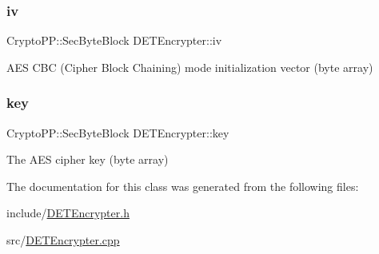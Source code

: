 \subsubsection{\texorpdfstring{iv}{iv}}
{\footnotesize\ttfamily Crypto\+P\+P\+::\+Sec\+Byte\+Block D\+E\+T\+Encrypter\+::iv\hspace{0.3cm}{\ttfamily [private]}}

A\+ES C\+BC (Cipher Block Chaining) mode initialization vector (byte array) \mbox{\label{classDETEncrypter_a698a78e4f1fb49cf02a005ee7bce6a99}} 
\subsubsection{\texorpdfstring{key}{key}}
{\footnotesize\ttfamily Crypto\+P\+P\+::\+Sec\+Byte\+Block D\+E\+T\+Encrypter\+::key\hspace{0.3cm}{\ttfamily [private]}}

The A\+ES cipher key (byte array) 

The documentation for this class was generated from the following files\+:\begin{DoxyCompactItemize}
\item 
include/\hyperlink{DETEncrypter_8h}{D\+E\+T\+Encrypter.\+h}\item 
src/\hyperlink{DETEncrypter_8cpp}{D\+E\+T\+Encrypter.\+cpp}\end{DoxyCompactItemize}
